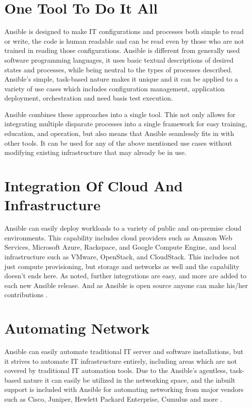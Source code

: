 \documentclass[9pt,twocolumn,twoside]{../../styles/osajnl}
\begin{document}
\section{One Tool To Do It All}

Ansible is designed to make IT configurations and processes both
simple to read or write, the code is human readable and can be read
even by those who are not trained in reading those
configurations. Ansible is different from generally used software
programming languages, it uses basic textual descriptions of desired
states and processes, while being neutral to the types of processes
described. Ansible’s simple, task-based nature makes it unique and it
can be applied to a variety of use cases which includes configuration
management, application deployment, orchestration and need basis test
execution.

Ansible combines these approaches into a single tool. This not only
allows for integrating multiple disparate processes into a single
framework for easy training, education, and operation, but also means
that Ansible seamlessly fits in with other tools. It can be used for
any of the above mentioned use cases without modifying existing
infrastructure that may already be in use.

\section{Integration Of Cloud And Infrastructure}

Ansible can easily deploy workloads to a variety of public and
on-premise cloud environments. This capability includes cloud
providers such as Amazon Web Services, Microsoft Azure, Rackspace, and
Google Compute Engine, and local infrastructure such as VMware,
OpenStack, and CloudStack. This includes not just compute
provisioning, but storage and networks as well and the capability
doesn't ends here. As noted, further integrations are easy, and more
are added to each new Ansible release. And as Ansible is open source
anyone can make his/her contributions \cite{www-ansible}.

\section{Automating Network}

Ansible can easily automate traditional IT server and software
installations, but it strives to automate IT infrastructure entirely,
including areas which are not covered by traditional IT automation
tools. Due to the Ansible’s agentless, task-based nature it can easily
be utilized in the networking space, and the inbuilt support is
included with Ansible for automating networking from major vendors
such as Cisco, Juniper, Hewlett Packard Enterprise, Cumulus and
more \cite{www-ansible3}.
\end{document}
